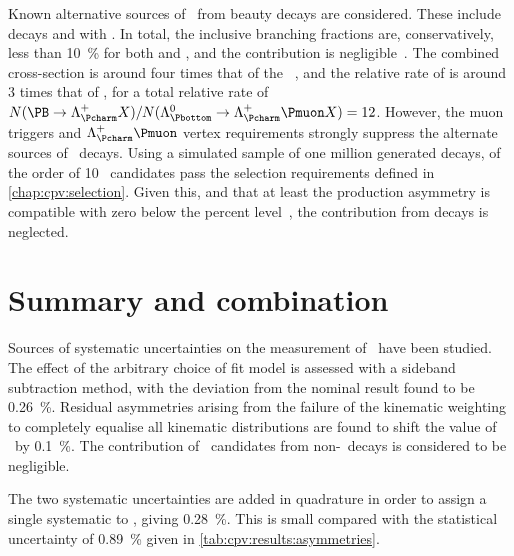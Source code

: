 Known alternative sources of \PLambdac\ from beauty decays are considered.
These include \decay{\PBplus}{\APLambdac\Pproton\Ppiplus} decays and
\decay{\PBplus}{\APSigmac\Pproton\Ppi\Ppi} with 
\decay{\PSigmac}{\PLambdac\Ppi}.
In total, the inclusive  branching fractions are, 
conservatively, less than \SI{10}{\percent} for both \PBplus and \PBzero, and 
the \PBs contribution is negligible~\cite{PDG2014}.
The combined \PB cross-section is around four times that of the 
\PLambdab~\cite{LHCb-PAPER-2013-004,Aaij:2015fea}, and the relative rate of 
 is around 3 times that of \LbToLcmuX, for a total 
relative rate of $N(\decay{\PB}{\PLambdac X})/N(\LbToLcmuX) = 12$.
However, the muon triggers and $\PLambdac\Pmuon$ vertex requirements strongly 
suppress the alternate sources of \PLambdac\ decays.
Using a simulated sample of one million generated 
\decay{\PBzero}{\APLambdac\Pproton\Ppiminus\Ppiplus} decays, of the order of 10 
\PLambdac\ candidates pass the selection requirements defined in 
\cref{chap:cpv:selection}.
Given this, and that at least the \PBzero production asymmetry is compatible 
with zero below the percent level~\cite{Aaij:2014bba}, the contribution from 
\PB decays is neglected.

\section{Summary and combination}
\label{chap:cpv:syst:summary}

Sources of systematic uncertainties on the measurement of \dACP\ have been 
studied.
The effect of the arbitrary choice of fit model is assessed with a sideband 
subtraction method, with the deviation from the nominal result found to be 
\SI{0.26}{\percent}.
Residual asymmetries arising from the failure of the kinematic weighting to 
completely equalise all kinematic distributions are found to shift the value of 
\dACP\ by \SI{0.1}{\percent}.
The contribution of \PLambdac\ candidates from non-\PLambdab\ decays is 
considered to be negligible.

The two systematic uncertainties are added in quadrature in order to assign a 
single systematic to \dACP, giving \SI{0.28}{\percent}.
This is small compared with the statistical uncertainty of \SI{0.89}{\percent} 
given in \cref{tab:cpv:results:asymmetries}.

